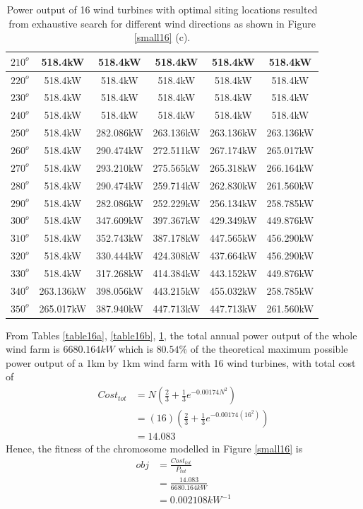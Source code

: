 \begin{table}[H]
\begin{tabular}{|c|c|c|c|c|c|}
		$210^o$	& 518.4kW	& 518.4kW	& 518.4kW	& 518.4kW	& 518.4kW	\\ \hline
		$220^o$	& 518.4kW	& 518.4kW	& 518.4kW	& 518.4kW	& 518.4kW	\\ \hline
		$230^o$	& 518.4kW	& 518.4kW	& 518.4kW	& 518.4kW	& 518.4kW	\\ \hline
		$240^o$	& 518.4kW	& 518.4kW	& 518.4kW	& 518.4kW	& 518.4kW	\\ \hline
		$250^o$	& 518.4kW	& 282.086kW	& 263.136kW	& 263.136kW	& 263.136kW	\\ \hline
		$260^o$	& 518.4kW	& 290.474kW	& 272.511kW	& 267.174kW	& 265.017kW	\\ \hline
		$270^o$	& 518.4kW	& 293.210kW	& 275.565kW	& 265.318kW	& 266.164kW	\\ \hline
		$280^o$	& 518.4kW	& 290.474kW	& 259.714kW	& 262.830kW	& 261.560kW	\\ \hline
		$290^o$	& 518.4kW	& 282.086kW	& 252.229kW	& 256.134kW	& 258.785kW	\\ \hline
		$300^o$	& 518.4kW	& 347.609kW	& 397.367kW	& 429.349kW	& 449.876kW	\\ \hline
		$310^o$	& 518.4kW	& 352.743kW	& 387.178kW	& 447.565kW	& 456.290kW	\\ \hline
		$320^o$	& 518.4kW	& 330.444kW	& 424.308kW	& 437.664kW	& 456.290kW	\\ \hline
		$330^o$	& 518.4kW	& 317.268kW	& 414.384kW	& 443.152kW	& 449.876kW	\\ \hline
		$340^o$	& 263.136kW	& 398.056kW	& 443.215kW	& 455.032kW	& 258.785kW	\\ \hline
		$350^o$	& 265.017kW	& 387.940kW	& 447.713kW	& 447.713kW	& 261.560kW	\\ \hline
        	\end{tabular}
        	\caption{Power output of 16 wind turbines with optimal siting locations resulted from exhaustive search for different wind directions as shown in Figure \ref{small16} (c).}
        	\label{table16c}
        \end{table}
        \doublespacing
        
        From Tables \ref{table16a}, \ref{table16b}, \ref{table16c}, the total annual power output of the whole wind farm is $6680.164kW$ which is $80.54\%$ of the theoretical maximum possible power output of a 1km by 1km wind farm with 16 wind turbines, with total cost of
        \begin{align*}
            Cost_{tot}
            &= N\left(\frac{2}{3} + \frac{1}{3}e^{-0.00174N^2}\right) \\
            &= \left(16\right)\left(\frac{2}{3} + \frac{1}{3}e^{-0.00174\left(16^2\right)}\right) \\
            &=14.083
        \end{align*}
        Hence, the fitness of the chromosome modelled in Figure \ref{small16} is
        \begin{align*}
            obj
            &=\frac{Cost_{tot}}{P_{tot}} \\
            &=\frac{14.083}{6680.164kW} \\
            &=0.002108kW^{-1}
        \end{align*}
        

